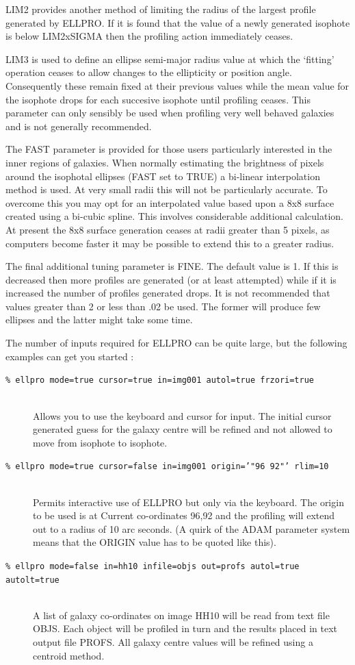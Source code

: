 \documentclass[twoside,11pt]{starlink}
\begin{document}
LIM2 provides another method of limiting the radius of the largest profile
generated by ELLPRO. If it is found that the value of a newly
generated isophote is below LIM2xSIGMA then the profiling action immediately
ceases.

LIM3 is used to define an ellipse semi-major radius value at which
the `fitting' operation ceases to allow changes to the ellipticity or
position angle. Consequently these remain fixed at their previous values
while the mean value for the isophote drops for each succesive
isophote until profiling ceases. This parameter can only sensibly be used
when profiling very well behaved galaxies and is not generally recommended.

The FAST parameter is provided for those users particularly interested in the
inner regions of galaxies. When normally estimating the brightness of
pixels around the isophotal ellipses (FAST set to TRUE) a bi-linear
interpolation method is used. At very small radii this will not be
particularly accurate. To overcome this you may opt for an
interpolated value based upon a 8x8 surface created using a
bi-cubic spline. This involves considerable additional calculation.
At present the 8x8 surface generation ceases at radii greater than
5 pixels, as computers become faster it may be possible to extend this
to a greater radius.

The final additional tuning parameter is FINE. The default value is 1.
If this is decreased then more profiles are generated
(or at least attempted)  while if it is increased the number of
profiles generated drops. It is not recommended that values greater
than 2 or less than .02 be used. The former will produce few ellipses
and the latter might take some time.

The number of inputs required for ELLPRO can be quite large, but the
following examples can get you started :

\begin{description}
\item[\texttt{\% ellpro mode=true cursor=true in=img001 autol=true frzori=true}]
   \mbox{}\\
  Allows you to use the keyboard and cursor for input. The initial
  cursor generated guess for the galaxy centre will be refined and
  not allowed to move from isophote to isophote.
\item[\texttt{\% ellpro mode=true cursor=false in=img001 origin='"96 92"' rlim=10}]
   \mbox{}\\
  Permits interactive use of ELLPRO but only via the keyboard. The origin
  to be used is at Current co-ordinates 96,92 and the profiling will extend
  out to a radius of 10 arc seconds.
  (A quirk of the ADAM parameter system means that the ORIGIN value has
  to be quoted like this).
\item[\texttt{\% ellpro mode=false in=hh10 infile=objs out=profs autol=true autolt=true}]
   \mbox{}\\
  A list of galaxy co-ordinates on image HH10 will be read from text
  file OBJS. Each object will be profiled in turn and the results placed
  in text output file PROFS. All galaxy centre values will be refined
  using a centroid method.
\end{description}
\end{document}
